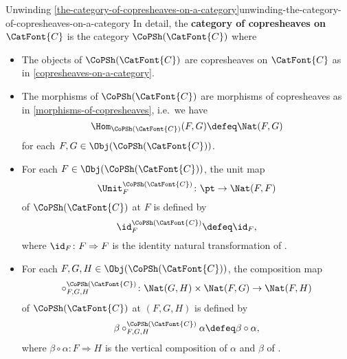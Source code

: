\begin{remark}{Unwinding \cref{the-category-of-copresheaves-on-a-category}}{unwinding-the-category-of-copresheaves-on-a-category}%
    In detail, the \textbf{category of copresheaves on $\CatFont{C}$} is the category $\CoPSh(\CatFont{C})$ where
    \begin{itemize}
        \item{}The objects of $\CoPSh(\CatFont{C})$ are copresheaves on $\CatFont{C}$ as in \cref{copresheaves-on-a-category}.
        \item{}The morphisms of $\CoPSh(\CatFont{C})$ are morphisms of copresheaves as in \cref{morphisms-of-copresheaves}, i.e.\ we have
            \[
                \Hom_{\CoPSh(\CatFont{C})}(F,G)%
                \defeq%
                \Nat(F,G)%
            \]%
            for each $F,G\in\Obj(\CoPSh(\CatFont{C}))$.
        \item{}For each $F\in\Obj(\CoPSh(\CatFont{C}))$, the unit map
            \[
                \Unit^{\CoPSh(\CatFont{C})}_{F}%
                \colon%
                \pt%
                \to%
                \Nat(F,F)%
            \]%
            of $\CoPSh(\CatFont{C})$ at $F$ is defined by
            \[
                \id^{\CoPSh(\CatFont{C})}_{F}
                \defeq
                \id_{F},%
            \]%
            where $\id_{F}\colon F\Rightarrow F$ is the identity natural transformation of .
        \item{}For each $F,G,H\in\Obj(\CoPSh(\CatFont{C}))$, the composition map
            \[
                \circ^{\CoPSh(\CatFont{C})}_{F,G,H}
                \colon
                \Nat(G,H)
                \times
                \Nat(F,G)
                \to
                \Nat(F,H)
            \]%
            of $\CoPSh(\CatFont{C})$ at $(F,G,H)$ is defined by
            \[
                \beta\circ^{\CoPSh(\CatFont{C})}_{F,G,H}\alpha%
                \defeq
                \beta\circ\alpha,%
            \]%
            where $\beta\circ\alpha\colon F\Rightarrow H$ is the vertical composition of $\alpha$ and $\beta$ of .
    \end{itemize}
\end{remark}

